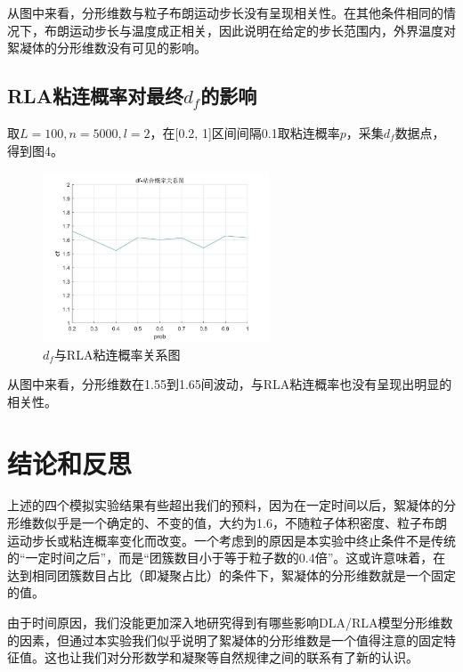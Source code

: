 \documentclass[lang=cn,11pt,a4paper,cite=authoryear]{elegantpaper}
\begin{document}
从图中来看，分形维数与粒子布朗运动步长没有呈现相关性。在其他条件相同的情况下，布朗运动步长与温度成正相关，因此说明在给定的步长范围内，外界温度对絮凝体的分形维数没有可见的影响。

\subsection{RLA粘连概率对最终$d_f$的影响}
取$L = 100, n = 5000, l = 2$，在[0.2, 1]区间间隔0.1取粘连概率$p$，采集$d_f$数据点，得到图4。
\begin{figure}[htbp]
    \centering
    \includegraphics[width=0.6\textwidth]{results/prob.png}
    \caption{$d_f$与RLA粘连概率关系图}
\end{figure}

从图中来看，分形维数在1.55到1.65间波动，与RLA粘连概率也没有呈现出明显的相关性。

\section{结论和反思}
上述的四个模拟实验结果有些超出我们的预料，因为在一定时间以后，絮凝体的分形维数似乎是一个确定的、不变的值，大约为1.6，不随粒子体积密度、粒子布朗运动步长或粘连概率变化而改变。一个考虑到的原因是本实验中终止条件不是传统的“一定时间之后”，而是“团簇数目小于等于粒子数的0.4倍”。这或许意味着，在达到相同团簇数目占比（即凝聚占比）的条件下，絮凝体的分形维数就是一个固定的值。

由于时间原因，我们没能更加深入地研究得到有哪些影响DLA/RLA模型分形维数的因素，但通过本实验我们似乎说明了絮凝体的分形维数是一个值得注意的固定特征值。这也让我们对分形数学和凝聚等自然规律之间的联系有了新的认识。
\end{document}
